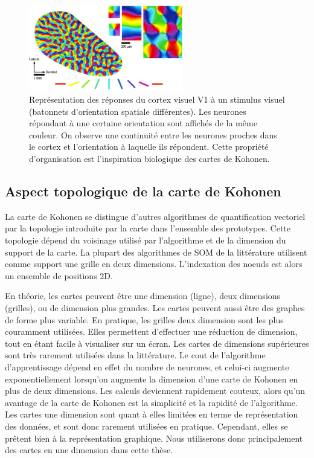 \begin{figure}
\centering
\includegraphics[width=0.6\textwidth]{v1.jpg}
\caption{Représentation des réponses du cortex visuel V1 à un stimulus visuel (batonnets d'orientation spatiale différentes). Les neurones répondant à une certaine orientation sont affichés de la même couleur. On observe une continuité entre les neurones proches dans le cortex et l'orientation à laquelle ils répondent. Cette propriété d'organisation est l'inspiration biologique des cartes de Kohonen. }
\label{fig:v1}
\end{figure}

\subsection{Aspect topologique de la carte de Kohonen}

La carte de Kohonen se distingue d'autres algorithmes de quantification vectoriel par la topologie introduite par la carte dans l'ensemble des prototypes. Cette topologie dépend du voisinage utilisé par l'algorithme et de la dimension du support de la carte.
La plupart des algorithmes de SOM de la littérature utilisent comme support une grille en deux dimensions. L'indexation des noeuds est alors un ensemble de positions 2D.


En théorie, les cartes peuvent être une dimension (ligne), deux dimensions (grilles), ou de dimension plus grandes. Les cartes peuvent aussi être des graphes de forme plus variable. En pratique, les grilles deux dimension sont les plus couramment utilisées. Elles permettent d'effectuer une réduction de dimension, tout en étant facile à visualiser sur un écran. Les cartes de dimensions supérieures sont très rarement utilisées dans la littérature. Le cout de l'algorithme d'apprentissage dépend en effet du nombre de neurones, et celui-ci augmente exponentiellement lorsqu'on augmente la dimension d'une carte de Kohonen en plus de deux dimensions. Les calculs deviennent rapidement couteux, alors qu'un avantage de la carte de Kohonen est la simplicité et la rapidité de l'algorithme. Les cartes une dimension sont quant à elles limitées en terme de représentation des données, et sont donc rarement utilisées en pratique. Cependant, elles se prêtent bien à la représentation graphique. Nous utiliserons donc principalement des cartes en une dimension dans cette thèse.


